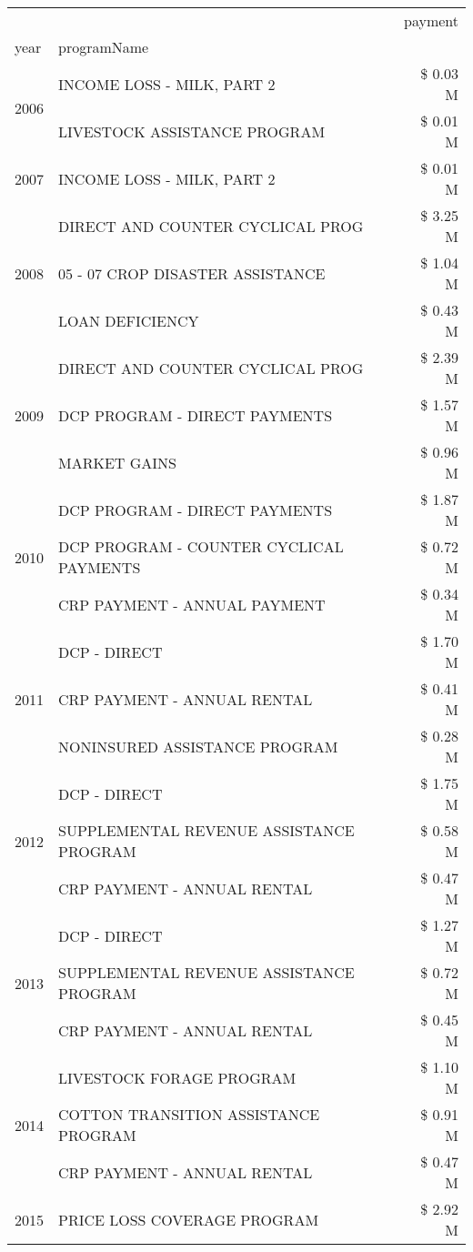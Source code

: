 \begin{tabular}{llr}
\toprule
 &  & payment \\
year & programName &  \\
\midrule
\multirow[t]{2}{*}{2006} & INCOME LOSS - MILK, PART 2 & \$ 0.03 M \\
 & LIVESTOCK ASSISTANCE PROGRAM & \$ 0.01 M \\
\cline{1-3}
2007 & INCOME LOSS - MILK, PART 2 & \$ 0.01 M \\
\cline{1-3}
\multirow[t]{3}{*}{2008} & DIRECT AND COUNTER CYCLICAL PROG & \$ 3.25 M \\
 & 05 - 07 CROP DISASTER ASSISTANCE & \$ 1.04 M \\
 & LOAN DEFICIENCY & \$ 0.43 M \\
\cline{1-3}
\multirow[t]{3}{*}{2009} & DIRECT AND COUNTER CYCLICAL PROG & \$ 2.39 M \\
 & DCP PROGRAM - DIRECT PAYMENTS & \$ 1.57 M \\
 & MARKET GAINS & \$ 0.96 M \\
\cline{1-3}
\multirow[t]{3}{*}{2010} & DCP PROGRAM - DIRECT PAYMENTS & \$ 1.87 M \\
 & DCP PROGRAM - COUNTER CYCLICAL PAYMENTS & \$ 0.72 M \\
 & CRP PAYMENT - ANNUAL PAYMENT & \$ 0.34 M \\
\cline{1-3}
\multirow[t]{3}{*}{2011} & DCP - DIRECT & \$ 1.70 M \\
 & CRP PAYMENT - ANNUAL RENTAL & \$ 0.41 M \\
 & NONINSURED ASSISTANCE PROGRAM & \$ 0.28 M \\
\cline{1-3}
\multirow[t]{3}{*}{2012} & DCP - DIRECT & \$ 1.75 M \\
 & SUPPLEMENTAL REVENUE ASSISTANCE PROGRAM & \$ 0.58 M \\
 & CRP PAYMENT - ANNUAL RENTAL & \$ 0.47 M \\
\cline{1-3}
\multirow[t]{3}{*}{2013} & DCP - DIRECT & \$ 1.27 M \\
 & SUPPLEMENTAL REVENUE ASSISTANCE PROGRAM & \$ 0.72 M \\
 & CRP PAYMENT - ANNUAL RENTAL & \$ 0.45 M \\
\cline{1-3}
\multirow[t]{3}{*}{2014} & LIVESTOCK FORAGE PROGRAM & \$ 1.10 M \\
 & COTTON TRANSITION ASSISTANCE PROGRAM & \$ 0.91 M \\
 & CRP PAYMENT - ANNUAL RENTAL & \$ 0.47 M \\
\cline{1-3}
\multirow[t]{3}{*}{2015} & PRICE LOSS COVERAGE PROGRAM & \$ 2.92 M \\

\end{tabular}
